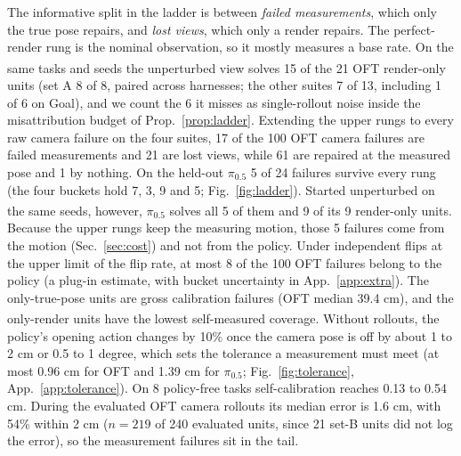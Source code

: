 \documentclass{article}
\newcommand{\pihalf}{$\pi_{0.5}$}
\newcommand{\ph}{\textsuperscript{\dag}}
\begin{document}
The informative split in the ladder is between \emph{failed measurements}, which only the true pose repairs, and
\emph{lost views}, which only a render repairs. The perfect-render rung is the nominal observation, so it mostly
measures a base rate. On the same tasks and seeds the unperturbed view\ph{} solves 15 of the 21 OFT render-only units
(set A 8 of 8, paired across harnesses; the other suites 7 of 13, including 1 of 6 on Goal), and we count the 6 it
misses as single-rollout noise inside the misattribution budget of Prop.~\ref{prop:ladder}. Extending the upper rungs
to every raw camera failure on the four suites, 17 of the 100 OFT camera failures are failed measurements and 21 are
lost views, while 61 are repaired at the measured pose and 1 by nothing. On the held-out \pihalf{} 5 of 24 failures
survive every rung (the four buckets hold 7, 3, 9 and 5; Fig.~\ref{fig:ladder}). Started unperturbed on the same
seeds\ph, however, \pihalf{} solves all 5 of them and 9 of its 9 render-only units. Because the upper rungs keep the
measuring motion, those 5 failures come from the motion (Sec.~\ref{sec:cost}) and not from the policy. Under
independent flips at the upper limit of the flip rate, at most 8 of the 100 OFT failures belong to the policy (a
plug-in estimate, with bucket uncertainty in App.~\ref{app:extra}). The only-true-pose units are gross calibration
failures (OFT median 39.4 cm), and the only-render units have the lowest self-measured coverage. Without rollouts\ph,
the policy's opening action changes by 10\% once the camera pose is off by about 1 to 2 cm or 0.5 to 1 degree, which
sets the tolerance a measurement must meet (at most 0.96 cm for OFT and 1.39 cm for \pihalf; Fig.~\ref{fig:tolerance},
App.~\ref{app:tolerance}). On 8 policy-free tasks self-calibration reaches 0.13 to 0.54 cm. During the evaluated OFT camera
rollouts its median error is 1.6 cm, with 54\% within 2 cm ($n = 219$ of 240 evaluated units, since 21 set-B units did
not log the error), so the measurement failures sit in the tail.
\end{document}

